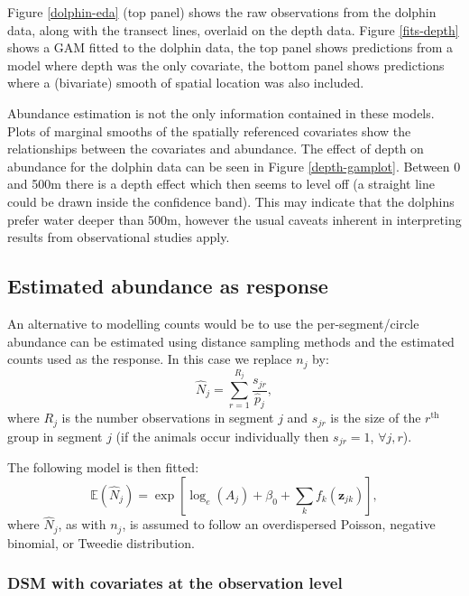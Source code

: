 \documentclass[a4paper,12pt]{article}
\begin{document}
Figure \ref{dolphin-eda} (top panel) shows the raw observations from the dolphin data, along with the transect lines, overlaid on the depth data. Figure \ref{fits-depth} shows a GAM fitted to the dolphin data, the top panel shows predictions from a model where depth was the only covariate, the bottom panel shows predictions where a (bivariate) smooth of spatial location was also included. 

Abundance estimation is not the only information contained in these models. Plots of marginal smooths of the spatially referenced covariates show the relationships between the covariates and abundance. The effect of depth on abundance for the dolphin data can be seen in Figure \ref{depth-gamplot}. Between 0 and 500m there is a depth effect which then seems to level off (a straight line could be drawn inside the confidence band). This may indicate that the dolphins prefer water deeper than 500m, however the usual caveats inherent in interpreting results from observational studies apply.


\subsection*{Estimated abundance as response}

An alternative to modelling counts would be to use the per-segment/circle abundance can be estimated using distance sampling methods and the estimated counts used as the response. In this case we replace $n_j$ by:
\begin{equation*}
\hat{N}_j = \sum_{r=1}^{R_j} \frac{s_{jr}}{\hat{p}_j},
\end{equation*}
where $R_j$ is the number observations in segment $j$ and $s_{jr}$ is the size of the $r^\text{th}$ group in segment $j$ (if the animals occur individually then $s_{jr}=1$, $\forall j,r$). 

The following model is then fitted:
\begin{equation*}
\mathbb{E}(\hat{N}_j) = \exp\left[ \log_e \left( A_j \right) + \beta_0 + \sum_k f_k\left(\bm{z}_{jk}\right) \right],
\end{equation*}
where $\hat{N}_j$, as with $n_j$, is assumed to follow an overdispersed Poisson, negative binomial, or Tweedie distribution.

\subsubsection*{DSM with covariates at the observation level}
\end{document}
